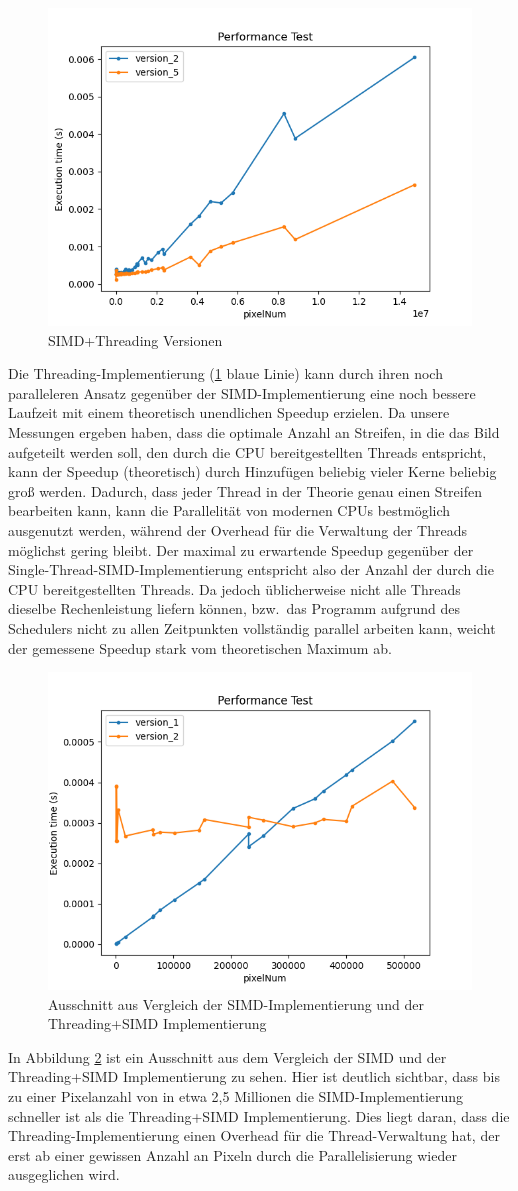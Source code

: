 \documentclass[course=erap]{aspdoc}
\begin{document}
\begin{figure}[H]
    \centering
    \includegraphics[width=.5\columnwidth]{graphics/version_2_5.png}
    \caption{SIMD+Threading Versionen}
    \label{fig:simd_threading}
\end{figure}

Die Threading-Implementierung (\ref{fig:simd_threading} blaue Linie) kann durch ihren noch paralleleren Ansatz gegenüber der SIMD-Implementierung eine noch bessere Laufzeit mit einem theoretisch unendlichen Speedup erzielen.
Da unsere Messungen ergeben haben, dass die optimale Anzahl an Streifen, in die das Bild aufgeteilt werden soll, den durch die CPU bereitgestellten Threads entspricht, kann der Speedup (theoretisch) durch Hinzufügen beliebig vieler Kerne beliebig groß werden.
Dadurch, dass jeder Thread in der Theorie genau einen Streifen bearbeiten kann, kann die Parallelität von modernen CPUs bestmöglich ausgenutzt werden, während der Overhead für die Verwaltung der Threads möglichst gering bleibt.
Der maximal zu erwartende Speedup gegenüber der Single-Thread-SIMD-Implementierung entspricht also der Anzahl der durch die CPU bereitgestellten Threads.
Da jedoch üblicherweise nicht alle Threads dieselbe Rechenleistung liefern können, bzw.\ das Programm aufgrund des Schedulers nicht zu allen Zeitpunkten vollständig parallel arbeiten kann, weicht der gemessene Speedup stark vom theoretischen Maximum ab.
\begin{figure}[H]
    \centering
    \includegraphics[width=.5\columnwidth]{graphics/version1_2_closeup.png}
    \caption{Ausschnitt aus Vergleich der SIMD-Implementierung und der Threading+SIMD Implementierung}
    \label{fig:small_threading}
\end{figure}
In Abbildung \ref{fig:small_threading} ist ein Ausschnitt aus dem Vergleich der SIMD und der Threading+SIMD Implementierung zu sehen.
Hier ist deutlich sichtbar, dass bis zu einer Pixelanzahl von in etwa 2,5 Millionen die SIMD-Implementierung schneller ist als die Threading+SIMD Implementierung.
Dies liegt daran, dass die Threading-Implementierung einen Overhead für die Thread-Verwaltung hat, der erst ab einer gewissen Anzahl an Pixeln durch die Parallelisierung wieder ausgeglichen wird.
\end{document}

